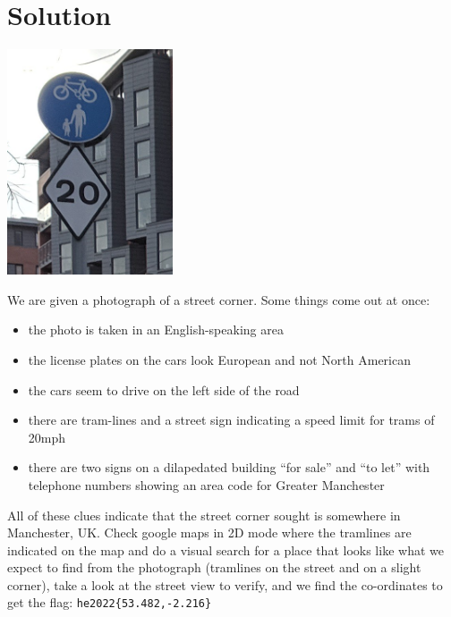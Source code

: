 \section{Solution}\label{hv22.33solution}

\begin{marginfigure}
	\includegraphics[width=49mm]{level7/street_sign.png}
\end{marginfigure}


We are given a photograph of a street corner.  Some things come out at once:
\begin{itemize}
\item the photo is taken in an English-speaking area
\item the license plates on the cars look European and not North American
\item the cars seem to drive on the left side of the road
\item there are tram-lines and a street sign indicating a speed limit for trams
	of 20mph
\item there are two signs on a dilapedated building ``for sale'' and ``to let''
	with telephone numbers showing an area code for Greater Manchester
\end{itemize}
All of these clues indicate that the street corner sought is somewhere in
Manchester, UK.  Check google maps in 2D mode where the tramlines are indicated
on the map and do a visual search for a place that looks like what we expect to
find from the photograph (tramlines on the street and on a slight corner), take
a look at the street view to verify, and we find the co-ordinates to get the
flag: \verb+he2022{53.482,-2.216}+





	









